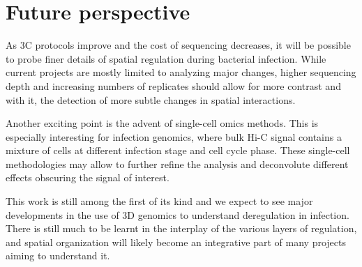 
\chapter{Future perspective} %

\label{ch:03-03} %

As 3C protocols improve and the cost of sequencing decreases, it will be possible to probe finer details of spatial regulation during bacterial infection. While current projects are mostly limited to analyzing major changes, higher sequencing depth and increasing numbers of replicates should allow for more contrast and with it, the detection of more subtle changes in spatial interactions.

Another exciting point is the advent of single-cell omics methods. This is especially interesting for infection genomics, where bulk Hi-C signal contains a mixture of cells at different infection stage and cell cycle phase. These single-cell methodologies may allow to further refine the analysis and deconvolute different effects obscuring the signal of interest.

This work is still among the first of its kind and we expect to see major developments in the use of 3D genomics to understand deregulation in infection. There is still much to be learnt in the interplay of the various layers of regulation, and spatial organization will likely become an integrative part of many projects aiming to understand it.

